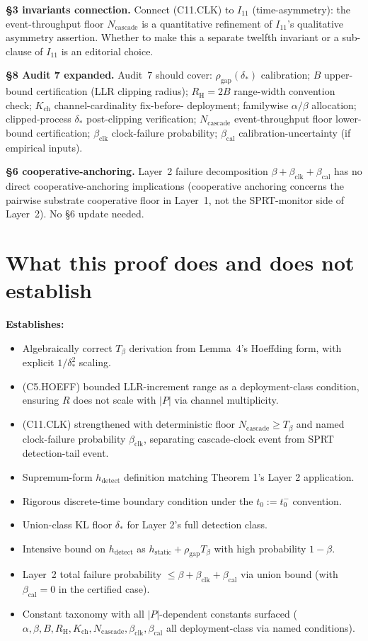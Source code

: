 \documentclass{article}
\newcommand{\deltastar}{\delta_{*}}
\newcommand{\rhogap}{\rho_{\mathrm{gap}}}
\newcommand{\Tbeta}{T_{\beta}}
\newcommand{\Ncasc}{N_{\mathrm{cascade}}}
\newcommand{\bclk}{\beta_{\mathrm{clk}}}
\newcommand{\bcal}{\beta_{\mathrm{cal}}}
\newcommand{\Bclip}{B}
\newcommand{\Rh}{R_{\mathrm{H}}}
\newcommand{\Kch}{K_{\mathrm{ch}}}
\begin{document}
\textbf{§3 invariants connection.}
Connect (C11.CLK) to $I_{11}$ (time-asymmetry): the event-throughput
floor $\Ncasc$ is a quantitative refinement of $I_{11}$'s qualitative
asymmetry assertion.  Whether to make this a separate twelfth
invariant or a sub-clause of $I_{11}$ is an editorial choice.

\textbf{§8 Audit 7 expanded.}
Audit~7 should cover: $\rhogap(\deltastar)$ calibration; $\Bclip$
upper-bound certification (LLR clipping radius); $\Rh = 2\Bclip$
range-width convention check; $\Kch$ channel-cardinality fix-before-
deployment; familywise $\alpha/\beta$ allocation; clipped-process
$\deltastar$ post-clipping verification; $\Ncasc$ event-throughput
floor lower-bound certification; $\bclk$ clock-failure probability;
$\bcal$ calibration-uncertainty (if empirical inputs).

\textbf{§6 cooperative-anchoring.}
Layer~2 failure decomposition $\beta + \bclk + \bcal$ has no direct
cooperative-anchoring implications (cooperative anchoring concerns
the pairwise substrate cooperative floor in Layer~1, not the
SPRT-monitor side of Layer~2).  No §6 update needed.

\section{What this proof does and does not establish}

\textbf{Establishes:}
\begin{itemize}
\item Algebraically correct $\Tbeta$ derivation from Lemma~4's
  Hoeffding form, with explicit $1/\deltastar^2$ scaling.
\item (C5.HOEFF) bounded LLR-increment range as a deployment-class
  condition, ensuring $R$ does not scale with $|P|$ via channel
  multiplicity.
\item (C11.CLK) strengthened with deterministic floor $\Ncasc \geq
  \Tbeta$ and named clock-failure probability $\bclk$, separating
  cascade-clock event from SPRT detection-tail event.
\item Supremum-form $h_{\mathrm{detect}}$ definition matching
  Theorem 1's Layer 2 application.
\item Rigorous discrete-time boundary condition under the
  $t_0 := t_0^-$ convention.
\item Union-class KL floor $\deltastar$ for Layer 2's full
  detection class.
\item Intensive bound on $h_{\mathrm{detect}}$ as $h_{\mathrm{static}}
  + \rhogap \Tbeta$ with high probability $1-\beta$.
\item Layer~2 total failure probability $\leq \beta + \bclk + \bcal$
  via union bound (with $\bcal = 0$ in the certified case).
\item Constant taxonomy with all $|P|$-dependent constants surfaced
  ($\alpha, \beta, \Bclip, \Rh, \Kch, \Ncasc, \bclk, \bcal$ all
  deployment-class via named conditions).
\end{itemize}
\end{document}
